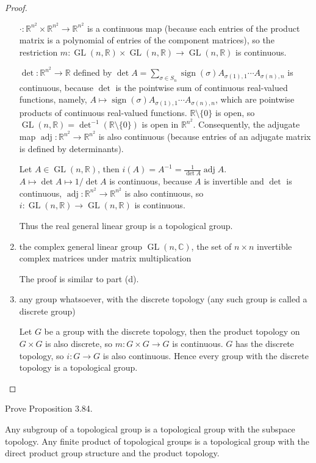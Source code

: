 \begin{proof}
\begin{enumerate}[label={(\alph*)}]
		      $\cdot: \mathbb{R}^{n^{2}}\times \mathbb{R}^{n^{2}}\to \mathbb{R}^{n^{2}}$ is a continuous map (because each entries of the product matrix is a polynomial of entries of the component matrices), so the restriction $m: \operatorname{GL}(n, \mathbb{R})\times\operatorname{GL}(n, \mathbb{R})\to \operatorname{GL}(n, \mathbb{R})$ is continuous.

		      $\det: \mathbb{R}^{n^{2}}\to \mathbb{R}$ defined by $\det A = \sum_{\sigma\in S_{n}}\operatorname{sign}(\sigma)A_{\sigma(1),1}\cdots A_{\sigma(n),n}$ is continuous, because $\det$ is the pointwise sum of continuous real-valued functions, namely, $A\mapsto \operatorname{sign}(\sigma)A_{\sigma(1),1}\cdots A_{\sigma(n),n}$, which are pointwise products of continuous real-valued functions. $\mathbb{R}\setminus\{0\}$ is open, so $\operatorname{GL}(n, \mathbb{R}) = \det^{-1}(\mathbb{R}\setminus\{0\})$ is open in $\mathbb{R}^{n^{2}}$. Consequently, the adjugate map $\operatorname{adj}: \mathbb{R}^{n^{2}}\to \mathbb{R}^{n^{2}}$ is also continuous (because entries of an adjugate matrix is defined by determinants).

		      Let $A\in \operatorname{GL}(n, \mathbb{R})$, then $i(A) = A^{-1} = \frac{1}{\det A}\operatorname{adj}A$. $A\mapsto \det A\mapsto 1/\det A$ is continuous, because $A$ is invertible and $\det$ is continuous, $\operatorname{adj}: \mathbb{R}^{n^{2}}\to \mathbb{R}^{n^{2}}$ is also continuous, so $i: \operatorname{GL}(n, \mathbb{R})\to \operatorname{GL}(n, \mathbb{R})$ is continuous.

		      Thus the real general linear group is a topological group.
		\item the complex general linear group $\operatorname{GL}(n, \mathbb{C})$, the set of $n\times n$ invertible complex matrices under matrix multiplication

		      The proof is similar to part (d).
		\item any group whatsoever, with the discrete topology (any such group is called a discrete group)

		      Let $G$ be a group with the discrete topology, then the product topology on $G\times G$ is also discrete, so $m: G\times G\to G$ is continuous. $G$ has the discrete topology, so $i: G\to G$ is also continuous. Hence every group with the discrete topology is a topological group.
	\end{enumerate}
\end{proof}

\begin{exercise}{3.85}
	Prove Proposition 3.84.

	Any subgroup of a topological group is a topological group with the subspace topology. Any finite product of topological groups is a topological group with the direct product group structure and the product topology.
\end{exercise}

